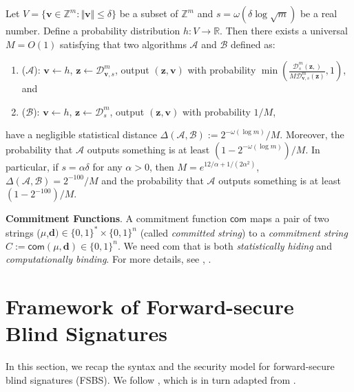 \documentclass[runningheads]{llncs}
\begin{document}
\begin{lemma}
	\label{lem3}
	Let $V=\{\mathbf{v}\in \mathbb{Z}^m: \Vert \mathbf{v} \Vert \leq \delta \}$ be a subset of $\mathbb{Z}^m$ 
	and  $s=\omega(\delta\log\sqrt{m})$ be a real number. Define a probability distribution $h:V \rightarrow \mathbb{R}$. 
	Then there exists a universal $M=O(1)$ satisfying that two algorithms $\mathcal{A}$ and $\mathcal{B}$ defined as:
	\begin{enumerate}
	\item ($\mathcal{A}$): $\mathbf{v} \leftarrow h$, $\mathbf{z} \leftarrow \mathcal{D}_{\mathbf{v},s} ^m$, 
		output $(\mathbf{z}, \mathbf{v} )$ with probability 
		$\min(\frac{\mathcal{D}_{s} ^m(\mathbf{z},)}{M\mathcal{D}_{\mathbf{v},s} ^m(\mathbf{z})},1)$, and
	\item ($\mathcal{B}$): $\mathbf{v} \leftarrow h$, $\mathbf{z} \leftarrow \mathcal{D}_{s}^m $, 
		output $(\mathbf{z}, \mathbf{v} )$ with probability $1/M$,
	\end{enumerate}
	have a negligible statistical distance $\Delta(\mathcal{A}, \mathcal{B}):=2^{-\omega(\log m)}/M$.
	Moreover, the probability that $\mathcal{A}$ outputs something is at least $(1-2^{-\omega(\log m)})/M$. 
	In particular, if $s=\alpha \delta$ for any $\alpha >0$, then $M=e^{12/\alpha+1/(2\alpha^2)}$,  
	$\Delta(\mathcal{A}, \mathcal{B})=2^{-100}/M$ and the probability that $\mathcal{A}$ 
	outputs something is at least $(1-2^{-100})/M$.
\end{lemma}
%
\noindent \textbf{Commitment Functions}. A commitment function
$\mathsf{com}$ maps a pair of two strings ($\mu$,$\mathbf{d}) \in \{0,1\}^* \times \{0,1\}^n$ 
(called \textit{committed string}) to a \textit{commitment string}  $C:=\mathsf{com}(\mu, \mathbf{d}) \in\{0,1\}^n$. 
We need \textsf{com} that is both 
 \textit{statistically hiding} and \textit{computationally binding}. 
 For more details, see \cite{Ruc10}, \cite{LDS20}.


\section{Framework of Forward-secure Blind Signatures}
%
In this section, we recap the syntax and the security model for
forward-secure blind signatures (\textsf{FSBS}). 
We follow \cite{DCK03}, which is in turn adapted from \cite{BM99}.
%
\end{document}
